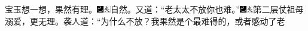 宝玉想一想，果然有理。{\includegraphics[width=3mm]{../Images/00003}\includegraphics[width=3mm]{../Images/00012}\footnotesize \kaishu 自然。}又道：“老太太不放你也难。”{\includegraphics[width=3mm]{../Images/00003}\includegraphics[width=3mm]{../Images/00012}\footnotesize \kaishu 第二层仗祖母溺爱，更无理。}袭人道：“为什么不放？我果然是个最难得的，或者感动了老